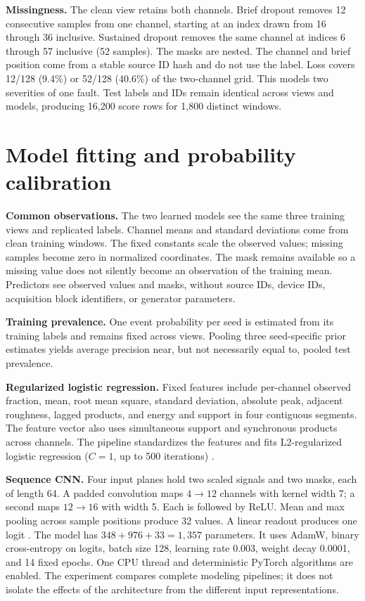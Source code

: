 \documentclass[11pt,letterpaper]{article}
\begin{document}
\textbf{Missingness.} The clean view retains both channels. Brief dropout removes 12 consecutive samples from one channel, starting at an index drawn from 16 through 36 inclusive. Sustained dropout removes the same channel at indices 6 through 57 inclusive (52 samples). The masks are nested. The channel and brief position come from a stable source ID hash and do not use the label. Loss covers 12/128 (9.4\%) or 52/128 (40.6\%) of the two-channel grid. This models two severities of one fault. Test labels and IDs remain identical across views and models, producing 16,200 score rows for 1,800 distinct windows.

\clearpage
\section{Model fitting and probability calibration}

\textbf{Common observations.} The two learned models see the same three training views and replicated labels. Channel means and standard deviations come from clean training windows. The fixed constants scale the observed values; missing samples become zero in normalized coordinates. The mask remains available so a missing value does not silently become an observation of the training mean. Predictors see observed values and masks, without source IDs, device IDs, acquisition block identifiers, or generator parameters.

\textbf{Training prevalence.} One event probability per seed is estimated from its training labels and remains fixed across views. Pooling three seed-specific prior estimates yields average precision near, but not necessarily equal to, pooled test prevalence.

\textbf{Regularized logistic regression.} Fixed features include per-channel observed fraction, mean, root mean square, standard deviation, absolute peak, adjacent roughness, lagged products, and energy and support in four contiguous segments. The feature vector also uses simultaneous support and synchronous products across channels. The pipeline standardizes the features and fits L2-regularized logistic regression (\(C=1\), up to 500 iterations) \cite{sklearn}.

\textbf{Sequence CNN.} Four input planes hold two scaled signals and two masks, each of length 64. A padded convolution maps \(4\to12\) channels with kernel width 7; a second maps \(12\to16\) with width 5. Each is followed by ReLU. Mean and max pooling across sample positions produce 32 values. A linear readout produces one logit \cite{pytorch}. The model has \(348+976+33=1,357\) parameters. It uses AdamW, binary cross-entropy on logits, batch size 128, learning rate 0.003, weight decay 0.0001, and 14 fixed epochs. One CPU thread and deterministic PyTorch algorithms are enabled. The experiment compares complete modeling pipelines; it does not isolate the effects of the architecture from the different input representations.
\end{document}

